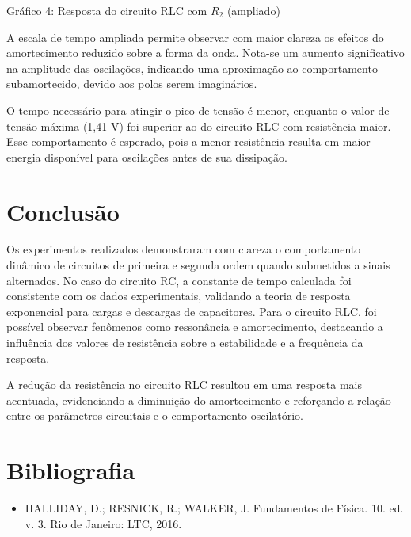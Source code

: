 \documentclass[a4 paper]{article}
\newcommand{\parag}{\hspace{30pt}}
\begin{document}
\begin{center}
Gráfico 4: Resposta do circuito RLC com $R_2$ (ampliado)
\end{center}

A escala de tempo ampliada permite observar com maior clareza os efeitos do amortecimento reduzido sobre a forma da onda. Nota-se um aumento significativo na amplitude das oscilações, indicando uma aproximação ao comportamento subamortecido, devido aos polos serem imaginários.

O tempo necessário para atingir o pico de tensão é menor, enquanto o valor de tensão máxima (1,41 V) foi superior ao do circuito RLC com resistência maior. Esse comportamento é esperado, pois a menor resistência resulta em maior energia disponível para oscilações antes de sua dissipação. 






\newpage
\section{Conclusão}

\parag Os experimentos realizados demonstraram com clareza o comportamento dinâmico de circuitos de primeira e segunda ordem quando submetidos a sinais alternados. No caso do circuito RC, a constante de tempo calculada foi consistente com os dados experimentais, validando a teoria de resposta exponencial para cargas e descargas de capacitores. Para o circuito RLC, foi possível observar fenômenos como ressonância e amortecimento, destacando a influência dos valores de resistência sobre a estabilidade e a frequência da resposta.

A redução da resistência no circuito RLC resultou em uma resposta mais acentuada, evidenciando a diminuição do amortecimento e reforçando a relação entre os parâmetros circuitais e o comportamento oscilatório. 


\vspace{30pt}
\section{Bibliografia}
\begin{itemize}
\item HALLIDAY, D.; RESNICK, R.; WALKER, J. Fundamentos de Física. 10. ed. v. 3. Rio de Janeiro: LTC, 2016.
\end{itemize}
\end{document}
